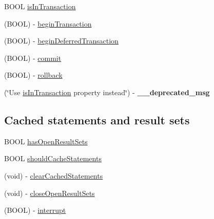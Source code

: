  

 \begin{DoxyCompactItemize}
\item 
B\+O\+OL \mbox{\hyperlink{interface_o_p_t_l_y_f_m_d_b_database_aad9ac9a8b17ad02d9595a11567ceb404}{is\+In\+Transaction}}
\item 
(B\+O\+OL) -\/ \mbox{\hyperlink{interface_o_p_t_l_y_f_m_d_b_database_aa49b282394be0570adb7ae4b8544b6b5}{begin\+Transaction}}
\item 
(B\+O\+OL) -\/ \mbox{\hyperlink{interface_o_p_t_l_y_f_m_d_b_database_ae42926b392d7862b8e4a2c7da6e12552}{begin\+Deferred\+Transaction}}
\item 
(B\+O\+OL) -\/ \mbox{\hyperlink{interface_o_p_t_l_y_f_m_d_b_database_a13149a1989b1cdb7a6f7b8f2b4207cfd}{commit}}
\item 
(B\+O\+OL) -\/ \mbox{\hyperlink{interface_o_p_t_l_y_f_m_d_b_database_a511569a0ee0c82136255920ebe9d28e6}{rollback}}
\item 
\mbox{\label{interface_o_p_t_l_y_f_m_d_b_database_a257b2b3e8fcfb0809ec3329e2b8688af}} 
(\char`\"{}Use \mbox{\hyperlink{interface_o_p_t_l_y_f_m_d_b_database_aad9ac9a8b17ad02d9595a11567ceb404}{is\+In\+Transaction}} property instead\char`\"{}) -\/ {\bfseries \+\_\+\+\_\+deprecated\+\_\+msg}
\end{DoxyCompactItemize}
\subsection*{Cached statements and result sets}
\label{_amgrpee330c7fa0c879a9d7c7b6f532a0fea3}%


 

 \begin{DoxyCompactItemize}
\item 
B\+O\+OL \mbox{\hyperlink{interface_o_p_t_l_y_f_m_d_b_database_a0fb326e01f4c551f821558e71709c104}{has\+Open\+Result\+Sets}}
\item 
B\+O\+OL \mbox{\hyperlink{interface_o_p_t_l_y_f_m_d_b_database_a892d607f231db0ffb8b98bbf5d914f2d}{should\+Cache\+Statements}}
\item 
(void) -\/ \mbox{\hyperlink{interface_o_p_t_l_y_f_m_d_b_database_a749d75414bd0c8525bcec404b9c746f1}{clear\+Cached\+Statements}}
\item 
(void) -\/ \mbox{\hyperlink{interface_o_p_t_l_y_f_m_d_b_database_a7b1edc77522099779f49fa74fcfe0036}{close\+Open\+Result\+Sets}}
\item 
(B\+O\+OL) -\/ \mbox{\hyperlink{interface_o_p_t_l_y_f_m_d_b_database_a1aa9233533d16b1fb7b68f272b2d488a}{interrupt}}
\end{DoxyCompactItemize}
